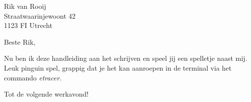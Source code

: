 \documentclass{aesbrief}
\begin{document}


\subject{Spellen spelen}

\signature{Laurens Stoop\\ \hektex{} lid}


\begin{brief}{
Rik van Rooij\\
Straatwaarinjewoont 42\\
1123 FI Utrecht}

\opening{Beste Rik,}

Nu ben ik deze handleiding aan het schrijven en speel jij een spelletje
 naast mij. Leuk pinguin spel, grappig dat je het kan aanroepen in 
 de terminal via het commando \emph{etracer}. 

\closing{Tot de volgende werkavond!}

\end{brief}
\end{document}
